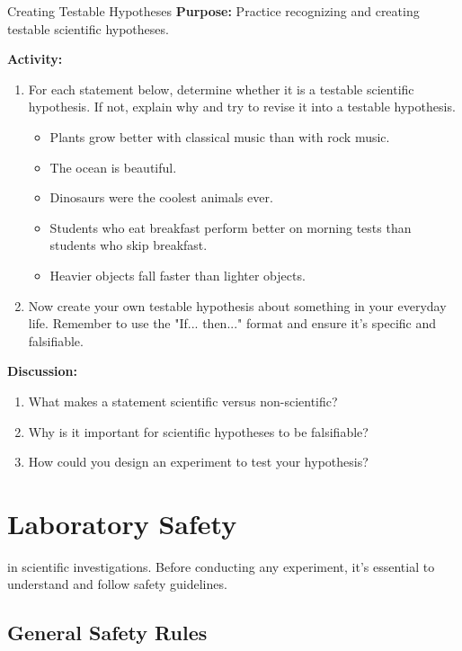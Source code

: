 \begin{investigation}{Creating Testable Hypotheses}
\textbf{Purpose:} Practice recognizing and creating testable scientific hypotheses.

\textbf{Activity:}
\begin{enumerate}
    \item For each statement below, determine whether it is a testable scientific hypothesis. If not, explain why and try to revise it into a testable hypothesis.
    
    \begin{itemize}
        \item Plants grow better with classical music than with rock music.
        \item The ocean is beautiful.
        \item Dinosaurs were the coolest animals ever.
        \item Students who eat breakfast perform better on morning tests than students who skip breakfast.
        \item Heavier objects fall faster than lighter objects.
    \end{itemize}
    
    \item Now create your own testable hypothesis about something in your everyday life. Remember to use the "If... then..." format and ensure it's specific and falsifiable.
\end{enumerate}

\textbf{Discussion:}
\begin{enumerate}
    \item What makes a statement scientific versus non-scientific?
    \item Why is it important for scientific hypotheses to be falsifiable?
    \item How could you design an experiment to test your hypothesis?
\end{enumerate}
\end{investigation}

\section{Laboratory Safety}

 in scientific investigations. Before conducting any experiment, it's essential to understand and follow safety guidelines.

\subsection{General Safety Rules}

